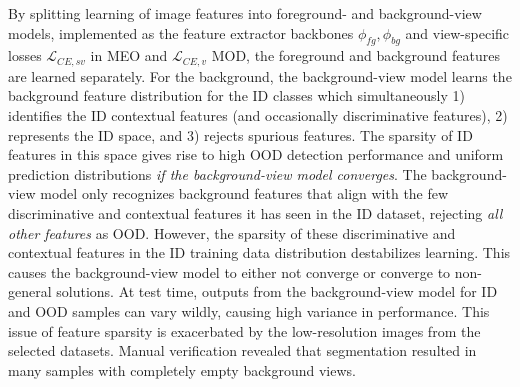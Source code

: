 By splitting learning of image features into foreground- and background-view models, implemented as the feature extractor backbones $\phi_{fg}, \phi_{bg}$ and view-specific losses $\mathcal{L}_{CE,sv}$ in MEO and $\mathcal{L}_{CE,v}$ MOD, the foreground and background features are learned separately.
For the background, the background-view model learns the background feature distribution for the ID classes which simultaneously 1) identifies the ID contextual features (and occasionally discriminative features), 2) represents the ID space, and 3) rejects spurious features. The sparsity of ID features in this space gives rise to high OOD detection performance and uniform prediction distributions \emph{if the background-view model converges}. The background-view model only recognizes background features that align with the few discriminative and contextual features it has seen in the ID dataset, rejecting \emph{all other features} as OOD. However, the sparsity of these discriminative and contextual features in the ID training data distribution destabilizes learning. This causes the background-view model to either not converge or converge to non-general solutions. At test time, outputs from the background-view model for ID and OOD samples can vary wildly, causing high variance in performance. This issue of feature sparsity is exacerbated by the low-resolution images from the selected datasets. Manual verification revealed that segmentation resulted in many samples with completely empty background views. %


